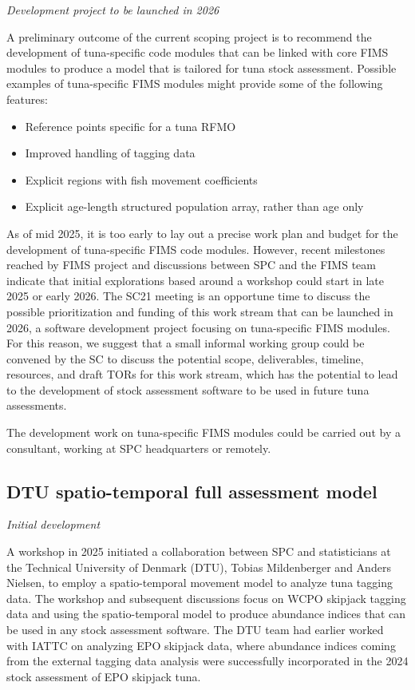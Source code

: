 \documentclass{SCreport}
\begin{document}
\textit{Development project to be launched in 2026}

A preliminary outcome of the current scoping project is to recommend the
development of tuna-specific code modules that can be linked with core FIMS
modules to produce a model that is tailored for tuna stock assessment. Possible
examples of tuna-specific FIMS modules might provide some of the following
features:

\begin{itemize}
  \item Reference points specific for a tuna RFMO\\[-4.5ex]
  \item Improved handling of tagging data\\[-4.5ex]
  \item Explicit regions with fish movement coefficients\\[-4.5ex]
  \item Explicit age-length structured population array, rather than age only
\end{itemize}

As of mid 2025, it is too early to lay out a precise work plan and budget for
the development of tuna-specific FIMS code modules. However, recent milestones
reached by FIMS project and discussions between SPC and the FIMS team indicate
that initial explorations based around a workshop could start in late 2025 or
early 2026. The SC21 meeting is an opportune time to discuss the possible
prioritization and funding of this work stream that can be launched in 2026, a
software development project focusing on tuna-specific FIMS modules. For this
reason, we suggest that a small informal working group could be convened by the
SC to discuss the potential scope, deliverables, timeline, resources, and draft
TORs for this work stream, which has the potential to lead to the development of
stock assessment software to be used in future tuna assessments.

The development work on tuna-specific FIMS modules could be carried out by a
consultant, working at SPC headquarters or remotely.

\subsection{DTU spatio-temporal full assessment model}

\textit{Initial development}

A workshop in 2025 initiated a collaboration between SPC and statisticians at
the Technical University of Denmark (DTU), Tobias Mildenberger and Anders
Nielsen, to employ a spatio-temporal movement model to analyze tuna tagging
data. The workshop and subsequent discussions focus on WCPO skipjack tagging
data and using the spatio-temporal model to produce abundance indices that can
be used in any stock assessment software. The DTU team had earlier worked with
IATTC on analyzing EPO skipjack data, where abundance indices coming from the
external tagging data analysis were successfully incorporated in the 2024 stock
assessment of EPO skipjack tuna.
\end{document}

